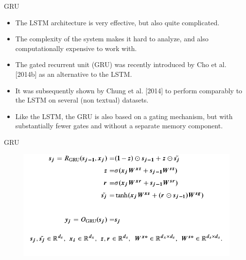 \documentclass[handout]{beamer}
\begin{document}
\begin{frame}{GRU}
\begin{scriptsize}

\begin{itemize}
\item The LSTM architecture is very effective, but also quite complicated.
\item The complexity of the system makes it hard to analyze, and also computationally expensive to work with.
\item The gated recurrent unit (GRU) was recently introduced by Cho et al. [2014b] as an alternative to the LSTM.
\item It was subsequently shown by Chung et al. [2014] to perform comparably to the LSTM on several (non textual) datasets.
\item Like the LSTM, the GRU is also based on a gating mechanism, but with substantially fewer gates and without a separate memory component.
\end{itemize}
\end{scriptsize}
\end{frame}



\begin{frame}{GRU}
  \begin{figure}[h]
        	\includegraphics[scale = 0.35]{pics/GRU.png}
        \end{figure}        
\end{frame}
\end{document}
